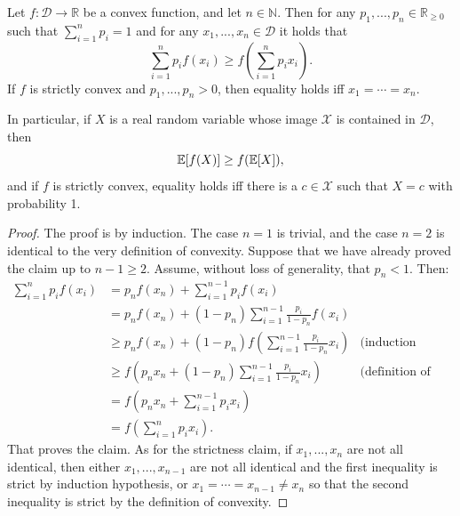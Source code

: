 \begin{theorem} Let $f : \mathcal{D} \to \mathbb{R}$ be a convex function, and let $n \in \mathbb{N}$. Then for any $p_1, ..., p_n \in \mathbb{R}_{\geq 0}$ such that $\sum_{i=1}^n p_i = 1$ and for any $x_1, ..., x_n \in \mathcal{D}$ it holds that
\[
\sum_{i=1}^n p_if(x_i) \geq f\left(\sum_{i=1}^np_ix_i\right).
\]
If $f$ is strictly convex and $p_1, ..., p_n > 0$, then equality holds iff $x_1 = \cdots = x_n$.

In particular, if $X$ is a real random variable whose image $\mathcal{X}$ is contained in $\mathcal{D}$, then
\[
\mathbb{E}[f(X)] \geq f(\mathbb{E}[X]),
\]
and if $f$ is strictly convex, equality holds iff there is a $c \in \mathcal{X}$ such that $X = c$ with probability 1.
\end{theorem}
\begin{proof}
The proof is by induction. The case $n=1$ is trivial, and the case $n=2$ is identical to the very definition of convexity. Suppose that we have already proved the claim up to $n-1 \geq 2$. Assume, without loss of generality, that $p_n < 1$. Then:
\begin{align}
\sum_{i=1}^n p_i f(x_i) &= p_n f(x_n) + \sum_{i=1}^{n-1} p_i f(x_i)\nonumber\\
&= p_n f(x_n) + (1-p_n)\sum_{i=1}^{n-1} \frac{p_i}{1-p_n} f(x_i)\nonumber\\
&\geq p_n f(x_n) + (1-p_n)f\left(\sum_{i=1}^{n-1} \frac{p_i}{1-p_n} x_i\right) & \mbox{(induction hypothesis)}\nonumber\\
&\geq f\left(p_n x_n + (1-p_n)\sum_{i=1}^{n-1} \frac{p_i}{1-p_n} x_i\right) & \mbox{(definition of convexity)}\nonumber\\
&= f\left(p_n x_n + \sum_{i=1}^{n-1} p_i x_i\right)\nonumber\\
&= f\left(\sum_{i=1}^np_ix_i\right).
\end{align}
That proves the claim. As for the strictness claim, if $x_1, ..., x_n$ are not all identical, then either $x_1, ..., x_{n-1}$ are not all identical and the first inequality is strict by induction hypothesis, or $x_1 = \cdots = x_{n-1} \neq x_n$ so that the second inequality is strict by the definition of convexity.
\end{proof}

